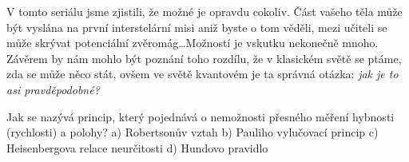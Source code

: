 \documentclass[crop=false]{standalone}
\begin{document}
V tomto seriálu jsme zjistili, že možné je opravdu cokoliv. Část vašeho těla může být vyslána na první interstelární misi aniž byste o tom věděli, mezi učiteli se může skrývat potenciální zvěromág\dots Možností je vskutku nekonečně mnoho. Závěrem by nám mohlo být poznání toho rozdílu, že v klasickém světě se ptáme, zda se může něco stát, ovšem ve světě kvantovém je ta správná otázka: \textit{jak je to asi pravděpodobné?}

Jak se nazývá princip, který pojednává o nemožnosti přesného měření hybnosti (rychlosti) a polohy?
a) Robertsonův vztah
b) Pauliho vylučovací princip
c) Heisenbergova relace neurčitosti
d) Hundovo pravidlo
\end{document}
